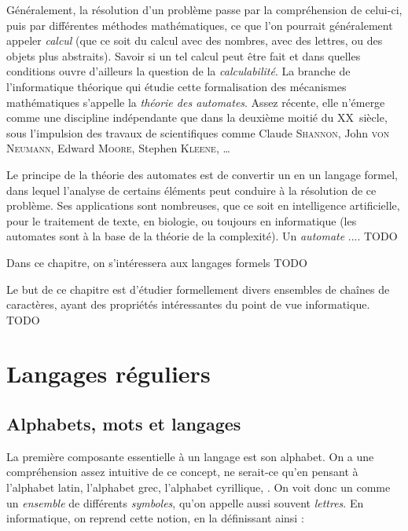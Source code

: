 \documentclass[a4paper,french,bookmarks]{book}
\newcommand{\chaptertoc}[0]{
    \begin{tcolorbox}[
        enhanced,
        frame hidden,
        sharp corners,
        detach title,
        spread outwards     = 5pt,
        halign              = center,
        valign              = center,
        borderline west     = {3pt}{0pt}{main20!50!main2!95!gray!90},
        coltitle            = main20!50!main2!95!gray!90, 
        interior style      = {
            left color      = main1white2!65!gray!11,
            middle color    = main1white2!50!gray!10,
            right color     = main1white2!35!gray!9
        },
        arc                 = 0 cm,
        title               = SOMMAIRE,
        boxrule             = 0pt,
        fonttitle           = \bfseries\sffamily,
        overlay             = {
            \node[rotate=90, minimum width=1cm, anchor=south,yshift=-0.8cm]
            at (frame.west) {\tcbtitle};
        }
    ]
        \begin{minipage}{0.83\linewidth}
            \sffamily
            \minitoc
        \end{minipage}
    \end{tcolorbox}
}
\begin{document}
    Généralement, la résolution d'un problème passe par la compréhension de celui-ci, puis par différentes méthodes mathématiques, ce que l'on pourrait généralement appeler \textit{calcul} (que ce soit du calcul avec des nombres, avec des lettres, ou des objets plus abstraits). Savoir si un tel calcul peut être fait et dans quelles conditions ouvre d'ailleurs la question de la \textit{calculabilité}. La branche de l'informatique théorique qui étudie cette formalisation des mécanismes mathématiques s'appelle la \textit{théorie des automates}. Assez récente, elle n'émerge comme une discipline indépendante que dans la deuxième moitié du \textsc{XX}\ieme~siècle, sous l'impulsion des travaux de scientifiques comme Claude \textsc{Shannon}, John \textsc{von Neumann}, Edward \textsc{Moore}, Stephen \textsc{Kleene}, \dots 
    
    Le principe de la théorie des automates est de convertir un  en un langage formel, dans lequel l'analyse de certains éléments peut conduire à la résolution de ce problème. Ses applications sont nombreuses, que ce soit en intelligence artificielle, pour le traitement de texte, en biologie, ou toujours en informatique (les automates sont à la base de la théorie de la complexité). Un \textit{automate} .... TODO
    
    Dans ce chapitre, on s'intéressera aux langages formels TODO

    Le but de ce chapitre est d'étudier formellement divers ensembles de
    chaînes de caractères, ayant des propriétés intéressantes du point de vue informatique. TODO
    
    \chaptertoc
    
    \section{Langages réguliers}
    
    \subsection{Alphabets, mots et langages}
    
    La première composante essentielle à un langage est son alphabet. On a une compréhension assez intuitive de ce concept, ne serait-ce qu'en pensant à l'alphabet latin, l'alphabet grec, l'alphabet cyrillique, \etc. On voit donc un  comme un \textit{ensemble} de différents \textit{symboles}, qu'on appelle aussi souvent \textit{lettres}. En informatique, on reprend cette notion, en la définissant ainsi :
        
\end{document}
